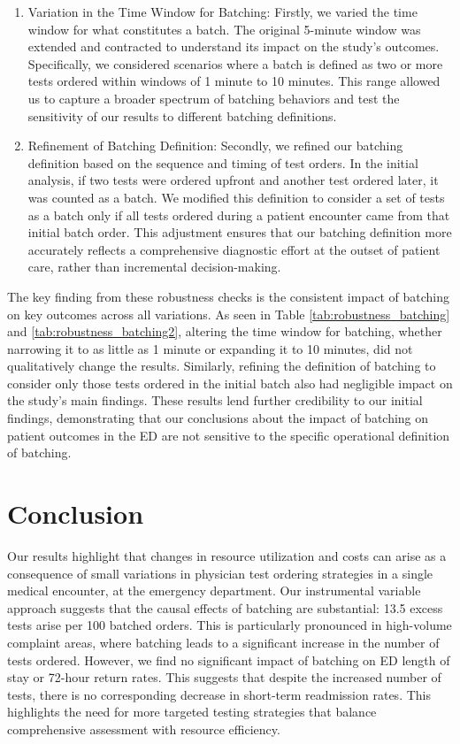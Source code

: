 \documentclass[,,nonblindrev]{informs}
\begin{document}
\begin{enumerate}
\def\labelenumi{(\arabic{enumi})}
\item
  Variation in the Time Window for Batching: Firstly, we varied the time
  window for what constitutes a batch. The original 5-minute window was
  extended and contracted to understand its impact on the study's
  outcomes. Specifically, we considered scenarios where a batch is
  defined as two or more tests ordered within windows of 1 minute to 10
  minutes. This range allowed us to capture a broader spectrum of
  batching behaviors and test the sensitivity of our results to
  different batching definitions.
\item
  Refinement of Batching Definition: Secondly, we refined our batching
  definition based on the sequence and timing of test orders. In the
  initial analysis, if two tests were ordered upfront and another test
  ordered later, it was counted as a batch. We modified this definition
  to consider a set of tests as a batch only if all tests ordered during
  a patient encounter came from that initial batch order. This
  adjustment ensures that our batching definition more accurately
  reflects a comprehensive diagnostic effort at the outset of patient
  care, rather than incremental decision-making.
\end{enumerate}

The key finding from these robustness checks is the consistent impact of
batching on key outcomes across all variations. As seen in Table
\ref{tab:robustness_batching} and \ref{tab:robustness_batching2},
altering the time window for batching, whether narrowing it to as little
as 1 minute or expanding it to 10 minutes, did not qualitatively change
the results. Similarly, refining the definition of batching to consider
only those tests ordered in the initial batch also had negligible impact
on the study's main findings. These results lend further credibility to
our initial findings, demonstrating that our conclusions about the
impact of batching on patient outcomes in the ED are not sensitive to
the specific operational definition of batching.

\hypertarget{conclusion}{%
\section{Conclusion}\label{conclusion}}

Our results highlight that changes in resource utilization and costs can
arise as a consequence of small variations in physician test ordering
strategies in a single medical encounter, at the emergency department.
Our instrumental variable approach suggests that the causal effects of
batching are substantial: 13.5 excess tests arise per 100 batched
orders. This is particularly pronounced in high-volume complaint areas,
where batching leads to a significant increase in the number of tests
ordered. However, we find no significant impact of batching on ED length
of stay or 72-hour return rates. This suggests that despite the
increased number of tests, there is no corresponding decrease in
short-term readmission rates. This highlights the need for more targeted
testing strategies that balance comprehensive assessment with resource
efficiency.
\end{document}
